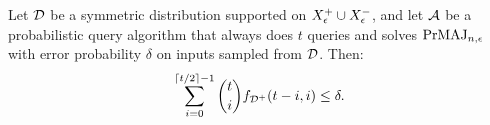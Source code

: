 



\begin{lemma}
\label{lem:symmetricbound}
Let $\mathcal{D}$ be a symmetric distribution supported on $X^+_\epsilon \cup X^-_\epsilon$,
 and let $\mathcal{A}$ be a probabilistic query algorithm
that always does $t$ queries and solves $\mathrm{PrMAJ}_{n, \epsilon}$ with error probability $\delta$ 
on inputs sampled from $\mathcal{D}$. 
Then:
$$
\sum_{i=0}^{\lceil t/2 \rceil-1} \binom{t}{i} f_{\mathcal{D}^+}(t-i, i) \leq \delta.
$$
\end{lemma}
